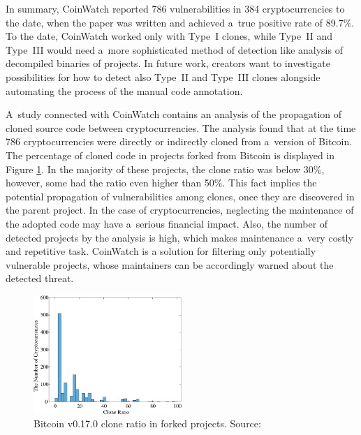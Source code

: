     In summary, CoinWatch reported 786 vulnerabilities in 384 cryptocurrencies to the date, when the paper
    was written and achieved a~true positive rate of 89.7\%. To the date, CoinWatch worked only with Type~I
    clones, while Type~II and Type~III would need a~more sophisticated method of detection like analysis of
    decompiled binaries of projects. In future work, creators want to investigate possibilities for how to
    detect also Type~II and Type~III clones alongside automating the process of the manual code
    annotation.

    A~study connected with CoinWatch contains an analysis of the propagation of cloned source code between
    cryptocurrencies. The analysis found that at the time 786 cryptocurrencies were directly or indirectly
    cloned from a~version of Bitcoin. The percentage of cloned code in projects forked from Bitcoin
    is displayed in Figure \ref{bitcoin-clone-ratio}. In the majority of these projects, the clone ratio was
    below 30\%, however, some had the ratio even higher than 50\%. This fact implies the potential propagation
    of vulnerabilities among clones, once they are discovered in the parent project. In the case of
    cryptocurrencies, neglecting the maintenance of the adopted code may have a~serious financial impact.
    Also, the number of detected projects by the analysis is high, which makes maintenance a~very costly
    and repetitive task. CoinWatch is a solution for filtering only potentially vulnerable projects,
    whose maintainers can be accordingly warned about the detected threat.

    \begin{figure}[h]
      \centering
      \includegraphics[width=0.5\textwidth]{obrazky-figures/clone_ratio_histogram.png}
      \caption{Bitcoin v0.17.0 clone ratio in forked projects. Source:~\cite{CoinWatch}}
      \label{bitcoin-clone-ratio}
    \end{figure}

